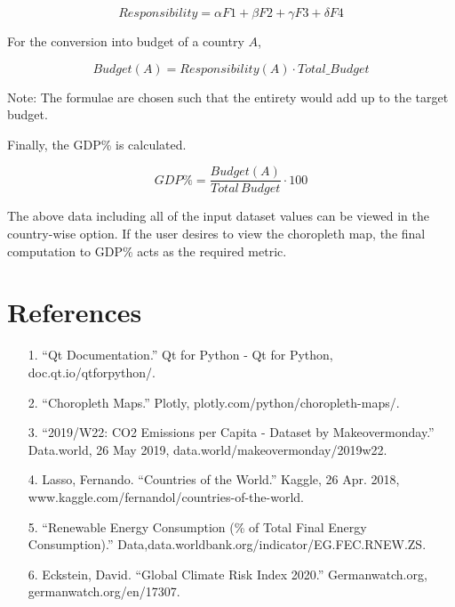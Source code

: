 \documentclass[fontsize=11pt]{article}
\begin{document}
\[
 Responsibility = \alpha F1 + \beta F2 + \gamma F3 + \delta F4
\]

For the conversion into budget of a country $A$,

\[
  Budget(A) = Responsibility(A) \cdot Total \_ Budget
\]

Note: The formulae are chosen such that the entirety would add up to the target budget.\newline

Finally, the  GDP\%  is calculated.

\[
  GDP \% = \frac{Budget(A)}{Total \, Budget} \cdot 100
\]

The above data including all of the input dataset values can be viewed in the country-wise option.
If the user desires to view the choropleth map, the final computation to GDP\% acts as the required metric.


\section*{References}

\begin{enumerate}
 \item[1.] “Qt Documentation.” Qt for Python - Qt for Python, doc.qt.io/qtforpython/.
 \item[2.] “Choropleth Maps.” Plotly, plotly.com/python/choropleth-maps/.
 \item[3.] “2019/W22: CO2 Emissions per Capita - Dataset by Makeovermonday.” Data.world, 26 May 2019,\newline
 data.world/makeovermonday/2019w22.
 \item[4.] Lasso, Fernando.
 “Countries of the World.” Kaggle, 26 Apr.
 2018, www.kaggle.com/fernandol/countries-of-the-world.
 \item[5.] “Renewable Energy Consumption
 (\% of Total Final Energy Consumption).” Data,\newline data.worldbank.org/indicator/EG.FEC.RNEW.ZS.
 \item[6.] Eckstein, David. “Global Climate Risk Index 2020.” Germanwatch.org, germanwatch.org/en/17307.
\end{enumerate}


\end{document}
